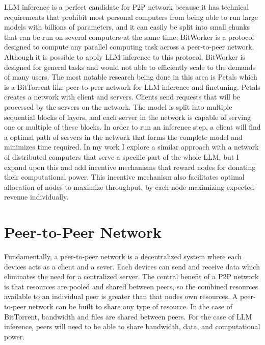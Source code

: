 \documentclass[preprint,twoside,11pt]{article}
\begin{document}
LLM inference is a perfect candidate for P2P network because it has technical requirements that prohibit most personal computers from being able to run
large models with billions of parameters, and it can easily be split into small chunks that can be run on several computers at the same time. BitWorker \citep{Durand_Gasparyan_Rouvinez_Aad_Braun_Trinh_2015} is a protocol designed to compute any parallel computing task across a peer-to-peer network.
Although it is possible to apply LLM inference to this protocol, BitWorker is designed for general tasks and would not able to efficiently scale to the demands of many users.
The most notable research being done in this area is Petals \citep{borzunov2023petalscollaborativeinferencefinetuning} which is a BitTorrent like peer-to-peer network for LLM inference and finetuning.
Petals creates a network with client and servers. Clients send requests that will be processed by the servers on the network. The model is split into multiple sequential blocks of layers, and each server
in the network is capable of serving one or multiple of these blocks. In order to run an inference step, a client will find a optimal path of servers
in the network that forms the complete model and minimizes time required. In my work I explore a similar approach with a network of distributed computers that serve a specific part of the whole LLM,
but I expand upon this and add incentive mechanisms that reward nodes for donating their computational power. This incentive mechanism also facilitates optimal allocation of nodes to maximize throughput, by each
node maximizing expected revenue individually.

\section{Peer-to-Peer Network}

Fundamentally, a peer-to-peer network is a decentralized system where each devices acts as a client and a sever.
Each devices can send and receive data which eliminates the need for a centralized server. The central benefit of a P2P network
is that resources are pooled and shared between peers, so the combined resources available to an individual peer is greater than that nodes own resources.
A peer-to-peer network can be built to share any type of resource. In the case of BitTorrent, bandwidth and files are shared between peers.
For the case of LLM inference, peers will need to be able to share bandwidth, data, and computational power.
\end{document}

